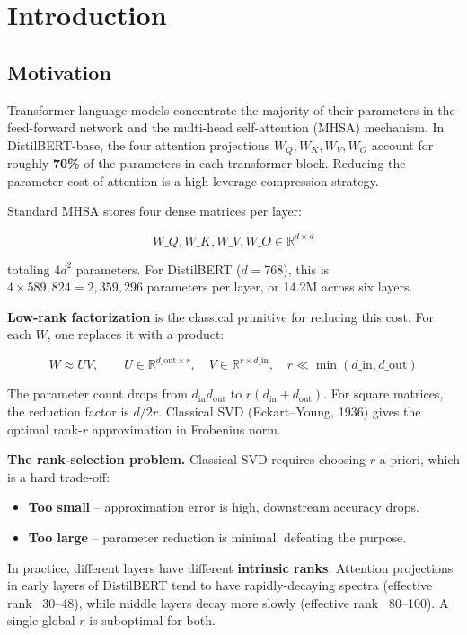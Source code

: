 
\section{Introduction}

\subsection{Motivation}

Transformer language models concentrate the majority of their parameters in 
the feed-forward network and the multi-head self-attention (MHSA) mechanism. 
In DistilBERT-base, the four attention projections $W_Q, W_K, W_V, W_O$ 
account for roughly \textbf{70\%} of the parameters in each transformer block. 
Reducing the parameter cost of attention is a high-leverage compression 
strategy.

Standard MHSA stores four dense matrices per layer:

\[
W\_Q, W\_K, W\_V, W\_O \in \mathbb{R}^{d \times d}
\tag{1.1}
\]

totaling $4 d^2$ parameters. For DistilBERT ($d = 768$), this is 
$4 \times 589{,}824 = 2{,}359{,}296$ parameters per layer, or 14.2M across 
six layers.

\textbf{Low-rank factorization} is the classical primitive for reducing this cost. 
For each $W$, one replaces it with a product:

\[
W \approx U V, \qquad
U \in \mathbb{R}^{d\_\text{out} \times r}, \quad
V \in \mathbb{R}^{r \times d\_\text{in}}, \quad r \ll \min(d\_\text{in}, d\_\text{out})
\tag{1.2}
\]

The parameter count drops from $d_\text{in} d_\text{out}$ to 
$r(d_\text{in} + d_\text{out})$. For square matrices, the reduction factor is 
$d / 2r$. Classical SVD (Eckart--Young, 1936) gives the optimal rank-$r$ 
approximation in Frobenius norm.

\textbf{The rank-selection problem.} Classical SVD requires choosing $r$ 
a-priori, which is a hard trade-off:

\begin{itemize}
\item \textbf{Too small} -- approximation error is high, downstream accuracy drops.
\item \textbf{Too large} -- parameter reduction is minimal, defeating the purpose.

\end{itemize}
In practice, different layers have different \textbf{intrinsic ranks}. Attention 
projections in early layers of DistilBERT tend to have rapidly-decaying 
spectra (effective rank ~30--48), while middle layers decay more slowly 
(effective rank ~80--100). A single global $r$ is suboptimal for both.

